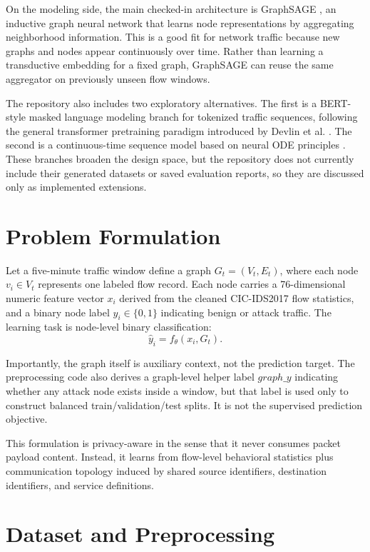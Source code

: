 \documentclass[conference]{IEEEtran}
\begin{document}
On the modeling side, the main checked-in architecture is GraphSAGE \cite{hamilton2017graphsage}, an inductive graph neural network that learns node representations by aggregating neighborhood information. This is a good fit for network traffic because new graphs and nodes appear continuously over time. Rather than learning a transductive embedding for a fixed graph, GraphSAGE can reuse the same aggregator on previously unseen flow windows.

The repository also includes two exploratory alternatives. The first is a BERT-style masked language modeling branch for tokenized traffic sequences, following the general transformer pretraining paradigm introduced by Devlin et al. \cite{devlin2019bert}. The second is a continuous-time sequence model based on neural ODE principles \cite{chen2018neuralode}. These branches broaden the design space, but the repository does not currently include their generated datasets or saved evaluation reports, so they are discussed only as implemented extensions.

\section{Problem Formulation}
Let a five-minute traffic window define a graph $G_t = (V_t, E_t)$, where each node $v_i \in V_t$ represents one labeled flow record. Each node carries a 76-dimensional numeric feature vector $x_i$ derived from the cleaned CIC-IDS2017 flow statistics, and a binary node label $y_i \in \{0,1\}$ indicating benign or attack traffic. The learning task is node-level binary classification:
\begin{equation}
\hat{y}_i = f_{\theta}(x_i, G_t).
\end{equation}

Importantly, the graph itself is auxiliary context, not the prediction target. The preprocessing code also derives a graph-level helper label $graph\_y$ indicating whether any attack node exists inside a window, but that label is used only to construct balanced train/validation/test splits. It is not the supervised prediction objective.

This formulation is privacy-aware in the sense that it never consumes packet payload content. Instead, it learns from flow-level behavioral statistics plus communication topology induced by shared source identifiers, destination identifiers, and service definitions.

\section{Dataset and Preprocessing}
\end{document}
